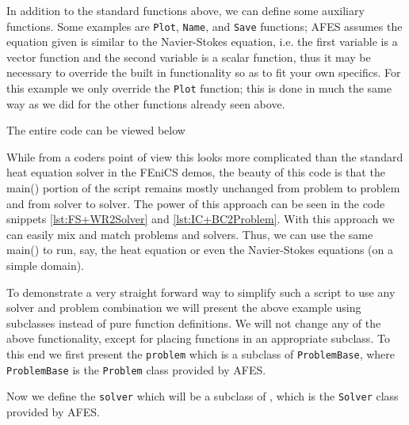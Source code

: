     In addition to the standard functions above, we can define some auxiliary
    functions. Some examples are \texttt{Plot}, \texttt{Name}, and \texttt{Save}
    functions; AFES assumes the equation given is similar to the Navier-Stokes
    equation, i.e. the first variable is a vector function and the second
    variable is a scalar function, thus it may be necessary to override the
    built in functionality so as to fit your own specifics. For this example we
    only override the \texttt{Plot} function; this is done in much the same way
    as we did for the other functions already seen above.
    
    

    The entire code can be viewed below
    

    While from a coders point of view this looks more complicated than the
    standard heat equation solver in the FEniCS demos, the beauty of this code
    is that the main() portion of the script remains mostly unchanged from
    problem to problem and from solver to solver. The power of this approach can
    be seen in the code snippets \autoref{lst:FS+WR2Solver} and
    \autoref{lst:IC+BC2Problem}.  With this approach we can easily mix and match
    problems and solvers. Thus, we can use the same main() to run, say, the heat
    equation or even the Navier-Stokes equations (on a simple domain).

    To demonstrate a very straight forward way to simplify such a script to use
    any solver and problem combination we will present the above example using
    subclasses instead of pure function definitions. We will not change any of
    the above functionality, except for placing functions in an appropriate
    subclass. To this end we first present the \texttt{problem} which is a
    subclass of \texttt{ProblemBase}, where \texttt{ProblemBase} is the
    \texttt{Problem} class provided by AFES.
    
    Now we define the \texttt{solver} which will be a subclass of
    , which is the \texttt{Solver} class provided by AFES.
    

